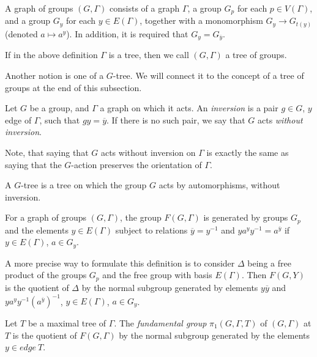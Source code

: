 \begin{definition}\label{grpgraph}
    A graph of groups $(G,\Gamma)$ consists of a graph $\Gamma$, a group $G_p$ for each $p \in V(\Gamma)$, and a group $G_y$ for each $y \in E(\Gamma)$, together with a monomorphism $G_y \to G_{t(y)}$ (denoted $a \mapsto a^y$). In addition, it is required that $G_y = G_{\overline{y}}$.
\end{definition}

If in the above definition $\Gamma$ is a tree, then we call $(G,\Gamma)$ a tree of groups.

Another notion is one of a $G$-tree. We will connect it to the concept of a tree of groups at the end of this subsection.

\begin{definition}
\label{def:graph_of_groups_action_without_inversion}
    Let $G$ be a group, and $\Gamma$ a graph on which it acts. An \emph{inversion} is a pair $g \in G$, $y$ edge of $\Gamma$, such that $gy = \overline{y}$. If there is no such pair, we say that $G$ acts \emph{without inversion}. 
\end{definition}

Note, that saying that $G$ acts without inversion on $\Gamma$ is exactly the same as saying that the $G$-action preserves the orientation of $\Gamma$.

\begin{definition}
    A $G$-tree is a tree on which the group $G$ acts by automorphisms, without inversion.
\end{definition}

\begin{definition}
    For a graph of groups $(G,\Gamma)$, the group $F(G,\Gamma)$ is generated by groups $G_p$ and the elements $y \in E(\Gamma)$ subject to relations $\overline{y} = y^{-1}$ and $ya^yy^{-1} = a^{\overline{y}}$ if $y \in E(\Gamma)$, $a \in G_y$.
\end{definition}

A more precise way to formulate this definition is to consider $\Delta$ being a free product of the groups $G_p$ and the free group with basis $E(\Gamma)$. Then $F(G,Y)$ is the quotient of $\Delta$ by the normal subgroup generated by elements $y\overline{y}$ and $ya^yy^{-1}(a^{\overline{y}})^{-1}$, $y \in E(\Gamma)$, $a \in G_y$.

\begin{definition}
    \label{def:graph_of_groups_fund_group}
    Let $T$ be a maximal tree of $\Gamma$. The \emph{fundamental group} $\pi_1(G,\Gamma,T)$ of $(G,\Gamma)$ at $T$ is the quotient of $F(G,\Gamma)$ by the normal subgroup generated by the elements $y \in edge\:T$.
\end{definition}

